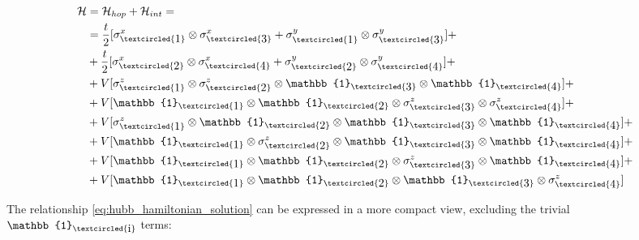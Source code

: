 \documentclass[twoside,twocolumn]{article}
\begin{document}
\begin{equation}\label{eq:hubb_hamiltonian_solution}
\begin{aligned}
\mathcal{H} &= \mathcal{H}_{hop} + \mathcal{H}_{int} = \\
&= \frac{t}{2} [ \sigma^x_{\textcircled{\raisebox{-0.9pt}{1}}} \otimes \sigma^x_{\textcircled{\raisebox{-0.9pt}{3}}}
  + \sigma^y_{\textcircled{\raisebox{-0.9pt}{1}}} \otimes \sigma^y_{\textcircled{\raisebox{-0.9pt}{3}}} ] + \\
&+ \frac{t}{2} [ \sigma^x_{\textcircled{\raisebox{-0.9pt}{2}}} \otimes \sigma^x_{\textcircled{\raisebox{-0.9pt}{4}}}
  + \sigma^y_{\textcircled{\raisebox{-0.9pt}{2}}} \otimes \sigma^y_{\textcircled{\raisebox{-0.9pt}{4}}} ] + \\
&+ V [\sigma^z_{\textcircled{\raisebox{-0.9pt}{1}}} \otimes \sigma^z_{\textcircled{\raisebox{-0.9pt}{2}}}
  \otimes \mathbb{1}_{\textcircled{\raisebox{-0.9pt}{3}}} \otimes \mathbb{1}_{\textcircled{\raisebox{-0.9pt}{4}}} ] +\\
&+ V [\mathbb{1}_{\textcircled{\raisebox{-0.9pt}{1}}} \otimes \mathbb{1}_{\textcircled{\raisebox{-0.9pt}{2}}}
  \otimes \sigma^z_{\textcircled{\raisebox{-0.9pt}{3}}} \otimes \sigma^z_{\textcircled{\raisebox{-0.9pt}{4}}} ] +\\
&+ V [\sigma^z_{\textcircled{\raisebox{-0.9pt}{1}}} \otimes \mathbb{1}_{\textcircled{\raisebox{-0.9pt}{2}}}
  \otimes \mathbb{1}_{\textcircled{\raisebox{-0.9pt}{3}}} \otimes \mathbb{1}_{\textcircled{\raisebox{-0.9pt}{4}}} ] +\\
&+ V [\mathbb{1}_{\textcircled{\raisebox{-0.9pt}{1}}} \otimes \sigma^z_{\textcircled{\raisebox{-0.9pt}{2}}}
  \otimes \mathbb{1}_{\textcircled{\raisebox{-0.9pt}{3}}} \otimes \mathbb{1}_{\textcircled{\raisebox{-0.9pt}{4}}} ] +\\
&+ V [\mathbb{1}_{\textcircled{\raisebox{-0.9pt}{1}}} \otimes \mathbb{1}_{\textcircled{\raisebox{-0.9pt}{2}}}
  \otimes \sigma^z_{\textcircled{\raisebox{-0.9pt}{3}}} \otimes \mathbb{1}_{\textcircled{\raisebox{-0.9pt}{4}}} ] +\\
&+ V [\mathbb{1}_{\textcircled{\raisebox{-0.9pt}{1}}} \otimes \mathbb{1}_{\textcircled{\raisebox{-0.9pt}{2}}}
  \otimes \mathbb{1}_{\textcircled{\raisebox{-0.9pt}{3}}} \otimes \sigma^z_{\textcircled{\raisebox{-0.9pt}{4}}}]\\
\end{aligned}
\end{equation}

The relationship \ref{eq:hubb_hamiltonian_solution} can be expressed in a more compact view,
excluding the trivial $\mathbb{1}_{\textcircled{\raisebox{-0.9pt}{i}}}$ terms:
\end{document}
